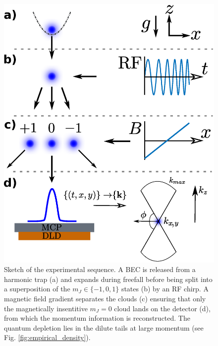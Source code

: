 	\begin{figure}
	    \begin{minipage}{0.4\textwidth}
	    \vspace{0cm}
	    \caption{Sketch of the experimental sequence. A BEC is released from a harmonic trap %
	    (a) and expands during freefall before being split into a superposition of the $m_J\in\{-1,0,1\}$ states (b) by an RF chirp. A magnetic field gradient separates the clouds (c) ensuring that only the magnetically insentitive $m_J=0$ cloud lands on the detector (d), from which the momentum information is reconstructed. The quantum depletion lies in the dilute tails at large momentum (see Fig. \ref{fig:empirical_density}).}
	    \label{fig:sequence}
	    \end{minipage}
	    \hfill
		\begin{minipage}{0.55\textwidth}
		\vspace{0cm}
	    \includegraphics[width=\textwidth]{fig/QD/exp_cartoon.eps}
	    \end{minipage}
	\end{figure}

